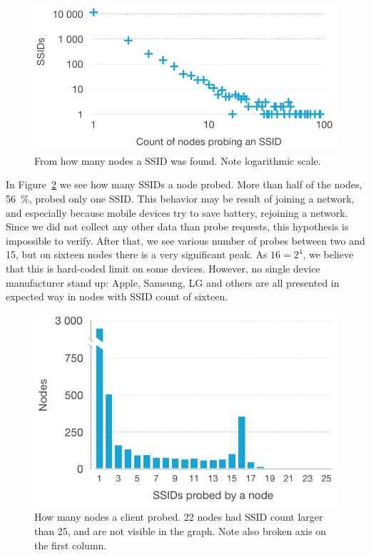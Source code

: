 \documentclass[12pt,a4paper,oneside,pdftex]{report}
\begin{document}
\begin{figure}
    \center
    \includegraphics{images/nodes_per_ssid}
    \caption{From how many nodes a SSID was found. Note logarithmic scale.}
    \label{fig:nodes_per_ssid}
\end{figure}

In Figure~\ref{fig:ssids_per_node} we see how many SSIDs a node probed. More than half of the nodes, 56~\%, probed only one SSID. This behavior may be result of joining a network, and especially because mobile devices try to save battery, rejoining a network. Since we did not collect any other data than probe requests, this hypothesis is impossible to verify. After that, we see various number of probes between two and 15, but on sixteen nodes there is a very significant peak. As $16 = 2^4$, we believe that this is hard-coded limit on some devices. However, no single device manufacturer stand up: Apple, Samsung, LG and others are all presented in expected way in nodes with SSID count of sixteen.

\begin{figure}
    \center
    \includegraphics{images/ssids_per_node}
    \caption{How many nodes a client probed. 22 nodes had SSID count larger than 25, and are not visible in the graph. Note also broken axis on the first column.}
    \label{fig:ssids_per_node}
\end{figure}
\end{document}
